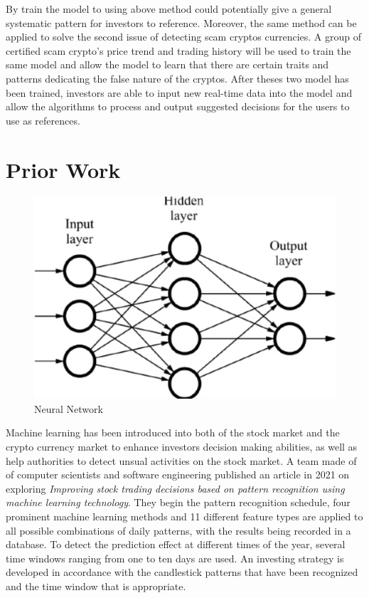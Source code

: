\documentclass[10pt,twocolumn]{article}
\begin{document}
    By train the model to using above method could potentially give a general systematic pattern for investors to reference. Moreover, the same method can be applied to solve the second issue of detecting scam cryptos currencies. A group of certified scam crypto's price trend and trading history will be used to train the same model and allow the model to learn that there are certain traits and patterns dedicating the false nature of the cryptos. After theses two model has been trained, investors are able to input new real-time data into the model and allow the algorithms to process and output suggested decisions for the users to use as references. 



\section{Prior Work}
\begin{figure}
    \centering
    \includegraphics[width=.95\linewidth]{neural1.jpg}
    \caption{
        Neural Network
    }
    \label{fig:first-page}
\end{figure}
Machine learning has been introduced into both of the stock market and the crypto currency market to enhance investors decision making abilities, as well as help authorities to detect unsual activities on the stock market. A team made of of computer scientists and software engineering published an article in 2021 on exploring \textit{Improving stock trading decisions based on pattern recognition using machine learning technology}. They begin the pattern recognition schedule, four prominent machine learning methods and 11 different feature types are applied to all possible combinations of daily patterns, with the results being recorded in a database. To detect the prediction effect at different times of the year, several time windows ranging from one to ten days are used. An investing strategy is developed in accordance with the candlestick patterns that have been recognized and the time window that is appropriate.
\end{document}
